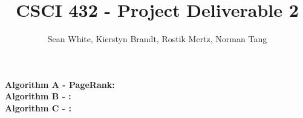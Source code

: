 \documentclass[12pt]{article}
\author{Sean White, Kierstyn Brandt, Rostik Mertz, Norman Tang}
\title{CSCI 432 - Project Deliverable 2}
\begin{document}
\maketitle

\noindent
\textbf{Algorithm A - PageRank:}\\

\noindent
\textbf{Algorithm B - :}\\

\noindent
\textbf{Algorithm C - :}\\
\end{document}
